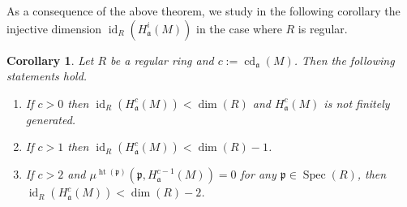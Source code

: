 \documentclass[12pt,twoside, final]{amsart}
\numberwithin{equation}{section}
\newtheorem{cor}[thm]{Corollary}
\newtheorem{nota rem}[thm]{Notation and Remark}
\newtheorem{defen rem}[thm]{Definition and Remark}
\def\hei{\operatorname{ht}}
\def\Spec{\operatorname{Spec}}
\def\cd{\operatorname{cd}}
\def\id{\operatorname{id}}
\def\dim{\operatorname{dim}}
\newcommand{\p}{\mathfrak{p}}
\newcommand{\fa}{\mathfrak{a}}
\begin{document}
As a consequence of the above theorem, we study in the following corollary the  injective dimension $\id_{R}(H^i_{\fa}(M))$ in the case where $R$ is regular. 

 \begin{cor}\label{inj}
Let $R$ be a regular ring and  $c:= \cd_{\fa}(M)$. Then the following statements hold.
 \begin{enumerate}
       \item If $c> 0$ then $\id_{R}(H^c_{\fa}(M))< \dim(R)$ and $H^c_{\fa}(M)$ is not finitely generated.
        \item If $c> 1$ then $\id_{R}(H^c_{\fa}(M))< \dim(R)- 1$.
        \item If $c> 2$ and   $\mu^{\hei(\p)}(\p, H^{c- 1}_{\fa}(M))= 0$ for any $\p\in \Spec(R)$, then $\id_{R}(H^c_{\fa}(M))< \dim(R)- 2$.
 \end{enumerate}
     
 \end{cor}
\end{document}

